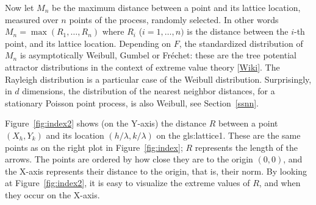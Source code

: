 \documentclass[10pt]{article}
\begin{document}

\noindent Now let $M_n$ be 
the maximum distance between a point and its lattice location, measured over $n$ points of the process, randomly selected. In other words
$M_n=\max(R_1,\dots,R_n)$ where $R_i$ ($i=1,\dots,n)$ is the distance between the $i$-th point, and its lattice location.   Depending on $F$, the standardized distribution of $M_n$ is asymptotically \textcolor{index}{Weibull}, Gumbel or Fréchet: these are the tree potential \textcolor{index}{attractor distributions} in the context of extreme value 
theory [\href{https://en.wikipedia.org/wiki/Extreme_value_theory}{Wiki}].  The Rayleigh distribution is a particular case of the Weibull distribution. Surprisingly, in $d$ dimensions, the
distribution of the \textcolor{index}{nearest neighbor distances}, for a stationary Poisson point process, is also Weibull, see Section~\ref{ssnn}. 

Figure~\ref{fig:index2} shows (on the Y-axis) the distance $R$ between a 
point $(X_h,Y_k)$ and its  location $(h/\lambda,k/\lambda)$ on the \gls{gls:lattice1}. These are the same points as on the
right plot in Figure~\ref{fig:index}; $R$ represents the length of the arrows. The points are ordered by how close they are to the origin $(0,0)$, and the X-axis represents their distance to the origin, that is, their norm. By looking at Figure~\ref{fig:index2}, it is easy to visualize the extreme values of $R$, and when they occur on the X-axis. \\

\end{document}
